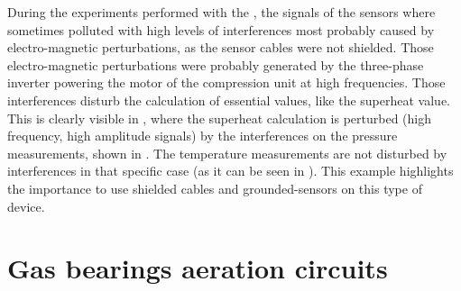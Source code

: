 During the experiments performed with the \AWP{}, the signals of the
sensors where sometimes polluted with high levels of interferences
most probably caused by electro-magnetic perturbations, as the sensor
cables were not shielded. Those electro-magnetic perturbations were
probably generated by the three-phase inverter powering the motor of
the compression unit at high frequencies. Those interferences disturb
the calculation of essential values, like the superheat value. This is
clearly visible in , where
the superheat calculation is perturbed (high frequency, high amplitude
signals) by the interferences on the pressure measurements, shown in
. The temperature
measurements are not disturbed by interferences in that specific case
(as it can be seen in
). This example highlights
the importance to use shielded cables and grounded-sensors on this
type of device.

\section{Gas bearings aeration circuits}
\label{sec:cp-intg-aeration}

